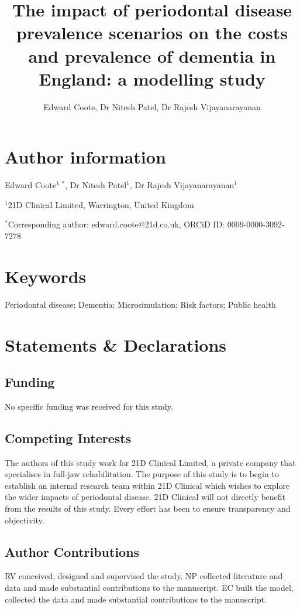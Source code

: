 \documentclass[11pt,a4paper]{article}
\title{\textbf{The impact of periodontal disease prevalence scenarios on the costs and prevalence of dementia in England: a modelling study}}
\author{Edward Coote, Dr Nitesh Patel, Dr Rajesh Vijayanarayanan}
\date{}
\begin{document}
\maketitle


\section*{Author information}
Edward Coote$^{1,*}$, Dr Nitesh Patel$^{1}$, Dr Rajesh Vijayanarayanan$^{1}$

$^{1}$21D Clinical Limited, Warrington, United Kingdom

$^{*}$Corresponding author: edward.coote@21d.co.uk, ORCiD ID: 0009-0000-3092-7278

\section*{Keywords}
Periodontal disease; Dementia; Microsimulation; Risk factors; Public health

\section*{Statements \& Declarations}

\subsection*{Funding}
No specific funding was received for this study.

\subsection*{Competing Interests}
The authors of this study work for 21D Clinical Limited, a private company that specialises in full-jaw rehabilitation. The purpose of this study is to begin to establish an internal research team within 21D Clinical which wishes to explore the wider impacts of periodontal disease. 21D Clinical will not directly benefit from the results of this study. Every effort has been to ensure transparency and objectivity.

\subsection*{Author Contributions}
RV conceived, designed and supervised the study. NP collected literature and data and made substantial contributions to the manuscript. EC built the model, collected the data and made substantial contributions to the manuscript.
\end{document}
